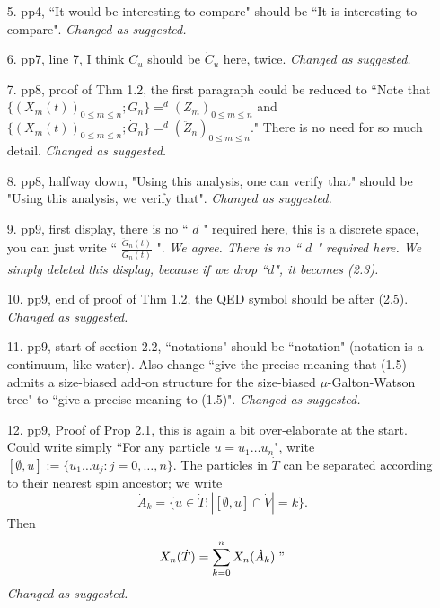 \documentclass[12pt,a4paper]{amsart}
\numberwithin{equation}{section}
\begin{document}
\begin{itemize}
	{\it 
	Our previous heuristic is not very clear. We revised the heuristic in the new version,  see p.5, after (1.9).}
\\
\item[5.]
	pp4, ``It would be interesting to compare" should be ``It is interesting to compare".
	{\it Changed as suggested.}
\\
\item[6.]
	pp7, line 7, I think $C_u$ should be $\dot C_u$ here, twice.
	{\it Changed as suggested.}
\\
\item[7.]
	pp8, proof of Thm 1.2, the first paragraph could be reduced to ``Note that $\{(X_m(t))_{0 \leq m \leq n}; G_n\} =^d (Z_m)_{0 \leq m \leq n}$ and $\{(X_m(t))_{0\leq m \leq n}; \dot G_n\} =^d (\ddot Z_n)_{0 \leq m \leq n}$." There is no need for so much detail.
	{\it Changed as suggested.}
\\	
\item[8.]
	pp8, halfway down, "Using this analysis, one can verify that" should be "Using this analysis, we verify that".
	{\it Changed as suggested.}
\\
\item[9.]
	pp9, first display, there is no `` $d$ " required here, this is a discrete space, you can just write `` $\frac{\ddot G_n(t)}{G_n(t)}$ ".
	{\it We agree.
		There is no `` $d$ " required here.
		We simply deleted this display, because if we drop
		``$d$", it becomes (2.3).}
\\
\item[10.]
	pp9, end of proof of Thm 1.2, the QED symbol should be after (2.5).
	{\it Changed as suggested.}
\\
\item[11.]
	pp9, start of section 2.2, ``notations" should be ``notation" (notation is a continuum, like water). Also change ``give the precise meaning that (1.5) admits a size-biased add-on structure for the size-biased $\mu$-Galton-Watson tree" to ``give a precise meaning to (1.5)".
	{\it Changed as suggested.}
\\	
\item[12.]
	pp9, Proof of Prop 2.1, this is again a bit over-elaborate at the start.
	Could write simply ``For any particle $u = u_1\dots u_n$", write $[\emptyset, u]:= \{u_1\dots u_j: j = 0,\dots, n\}$.
	The particles in $\dot T$ can be separated according to their nearest spin ancestor; we write
\[
	\dot A_k = \{ u \in \dot T: |[\emptyset, u] \cap \dot V| = k\}.
\]
	Then
\[
	X_n(\dot T) = \sum_{k=0}^n X_n(\dot A_k). "
\]
	{\it Changed as suggested.}

\end{itemize}
\end{document}
